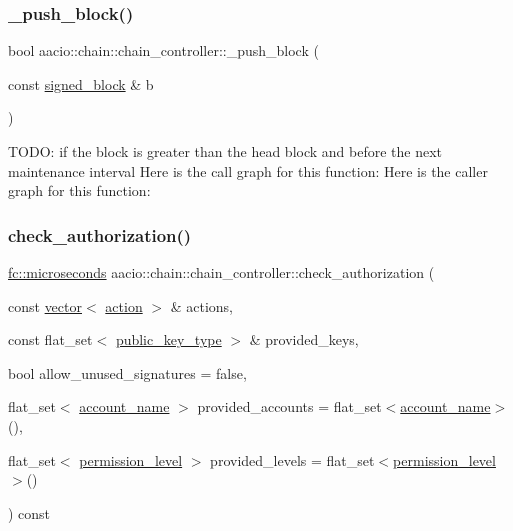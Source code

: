 \subsubsection{\texorpdfstring{\+\_\+push\+\_\+block()}{\_push\_block()}}
{\footnotesize\ttfamily bool aacio\+::chain\+::chain\+\_\+controller\+::\+\_\+push\+\_\+block (\begin{DoxyParamCaption}\item[{const \mbox{\hyperlink{structaacio_1_1chain_1_1signed__block}{signed\+\_\+block}} \&}]{b }\end{DoxyParamCaption})}

T\+O\+DO\+: if the block is greater than the head block and before the next maintenance interval Here is the call graph for this function\+:
Here is the caller graph for this function\+:
\mbox{\label{classaacio_1_1chain_1_1chain__controller_a207cee9826f5abac00f1de3c5735df3d}} 
\subsubsection{\texorpdfstring{check\+\_\+authorization()}{check\_authorization()}\hspace{0.1cm}{\footnotesize\ttfamily [1/2]}}
{\footnotesize\ttfamily \mbox{\hyperlink{classfc_1_1microseconds}{fc\+::microseconds}} aacio\+::chain\+::chain\+\_\+controller\+::check\+\_\+authorization (\begin{DoxyParamCaption}\item[{const \mbox{\hyperlink{classstd_1_1vector}{vector}}$<$ \mbox{\hyperlink{structaacio_1_1chain_1_1action}{action}} $>$ \&}]{actions,  }\item[{const flat\+\_\+set$<$ \mbox{\hyperlink{classfc_1_1crypto_1_1public__key}{public\+\_\+key\+\_\+type}} $>$ \&}]{provided\+\_\+keys,  }\item[{bool}]{allow\+\_\+unused\+\_\+signatures = {\ttfamily false},  }\item[{flat\+\_\+set$<$ \mbox{\hyperlink{structaacio_1_1chain_1_1name}{account\+\_\+name}} $>$}]{provided\+\_\+accounts = {\ttfamily flat\+\_\+set$<$\mbox{\hyperlink{structaacio_1_1chain_1_1name}{account\+\_\+name}}$>$()},  }\item[{flat\+\_\+set$<$ \mbox{\hyperlink{structaacio_1_1chain_1_1permission__level}{permission\+\_\+level}} $>$}]{provided\+\_\+levels = {\ttfamily flat\+\_\+set$<$\mbox{\hyperlink{structaacio_1_1chain_1_1permission__level}{permission\+\_\+level}}$>$()} }\end{DoxyParamCaption}) const}


